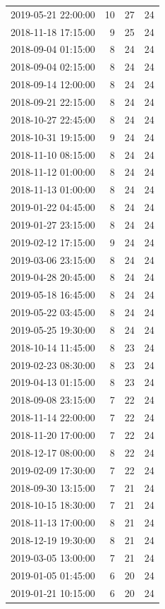 \begin{tabular}{lrrr}
2019-05-21 22:00:00 & 10 & 27 & 24 \\
2018-11-18 17:15:00 & 9 & 25 & 24 \\
2018-09-04 01:15:00 & 8 & 24 & 24 \\
2018-09-04 02:15:00 & 8 & 24 & 24 \\
2018-09-14 12:00:00 & 8 & 24 & 24 \\
2018-09-21 22:15:00 & 8 & 24 & 24 \\
2018-10-27 22:45:00 & 8 & 24 & 24 \\
2018-10-31 19:15:00 & 9 & 24 & 24 \\
2018-11-10 08:15:00 & 8 & 24 & 24 \\
2018-11-12 01:00:00 & 8 & 24 & 24 \\
2018-11-13 01:00:00 & 8 & 24 & 24 \\
2019-01-22 04:45:00 & 8 & 24 & 24 \\
2019-01-27 23:15:00 & 8 & 24 & 24 \\
2019-02-12 17:15:00 & 9 & 24 & 24 \\
2019-03-06 23:15:00 & 8 & 24 & 24 \\
2019-04-28 20:45:00 & 8 & 24 & 24 \\
2019-05-18 16:45:00 & 8 & 24 & 24 \\
2019-05-22 03:45:00 & 8 & 24 & 24 \\
2019-05-25 19:30:00 & 8 & 24 & 24 \\
2018-10-14 11:45:00 & 8 & 23 & 24 \\
2019-02-23 08:30:00 & 8 & 23 & 24 \\
2019-04-13 01:15:00 & 8 & 23 & 24 \\
2018-09-08 23:15:00 & 7 & 22 & 24 \\
2018-11-14 22:00:00 & 7 & 22 & 24 \\
2018-11-20 17:00:00 & 7 & 22 & 24 \\
2018-12-17 08:00:00 & 8 & 22 & 24 \\
2019-02-09 17:30:00 & 7 & 22 & 24 \\
2018-09-30 13:15:00 & 7 & 21 & 24 \\
2018-10-15 18:30:00 & 7 & 21 & 24 \\
2018-11-13 17:00:00 & 8 & 21 & 24 \\
2018-12-19 19:30:00 & 8 & 21 & 24 \\
2019-03-05 13:00:00 & 7 & 21 & 24 \\
2019-01-05 01:45:00 & 6 & 20 & 24 \\
2019-01-21 10:15:00 & 6 & 20 & 24 \\

\end{tabular}
